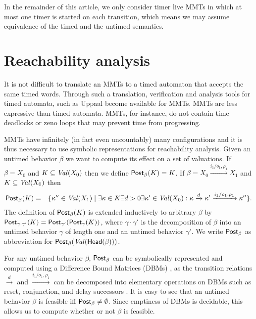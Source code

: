 In the remainder of this article, we only consider timer live MMTs in which at most one timer is started on each transition,
which means we may assume equivalence of the timed and the untimed semantics.

\iflong
\section{Reachability analysis}

It is not difficult to translate an MMTs to a timed automaton \cite{AD94,BengtssonY03} that accepts the same timed words.
Through such a translation, verification and analysis tools for timed automata, such as Uppaal \cite{Uppaal4.0}
become available for MMTs.
MMTs are less expressive than timed automata. MMTs, for instance, do not contain time deadlocks or zeno loops that
may prevent time from progressing.

MMTs have infinitely (in fact even uncountably) many configurations and it is thus necessary to use symbolic representations
for reachability analysis. Given an untimed behavior $\beta$ we want to compute its effect on a set of valuations. 
If $\beta =X_0$ and $K \subseteq\mathit{Val}({X_0})$ then we define $\mathsf{Post}_{\beta}(K) = K$.
If $\beta = X_0 \xrightarrow{i_1/o_1, \rho_1} X_1$ and
$K \subseteq\mathit{Val}({X_0})$ then
\begin{eqnarray*}
\mathsf{Post}_{\beta}(K) & = & \{ \kappa'' \in\mathit{Val}({X_1}) \mid \exists \kappa \in K \exists d >0 \exists \kappa' \in\mathit{Val}({X_0}) :
 \kappa \xrightarrow{d} \kappa' \xrightarrow{i_1/o_1, \rho_1} \kappa'' \}.
\end{eqnarray*}
The definition of $\mathsf{Post}_{\beta}(K)$ is extended inductively to arbitrary $\beta$ by 
$\mathsf{Post}_{\gamma \cdot \gamma'}(K) = \mathsf{Post}_{\gamma'} (\mathsf{Post}_{\gamma}(K))$, where $\gamma \cdot \gamma'$ is the decomposition of
$\beta$ into an untimed behavior $\gamma$ of length one and an untimed behavior $\gamma'$.
We write $\mathsf{Post}_{\beta}$ as abbreviation for $\mathsf{Post}_{\beta}(\mathit{Val}({\mathsf{Head}({\beta})}))$.

For any untimed behavior $\beta$, $\mathsf{Post}_{\beta}$ can be symbolically represented and computed using a Difference Bound Matrices (DBMs)
 \cite{Di89},  as the transition relations $\xrightarrow{d}$ and $\xrightarrow{i_1/o_1, \rho_1}$ can be decomposed 
into elementary operations on DBMs such as reset, conjunction, and delay successors \cite{BengtssonY03}.
%
It is easy to see that an untimed behavior $\beta$ is feasible iff $\mathsf{Post}_{\beta} \neq \emptyset$.
Since emptiness of DBMs is decidable, this allows us to compute whether or not $\beta$ is feasible.

